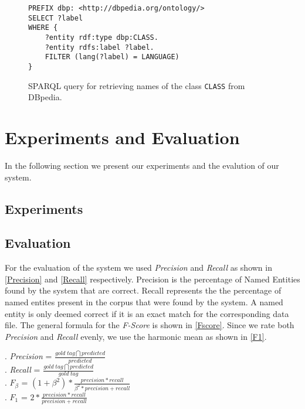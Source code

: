 \documentclass[11pt]{article}
\begin{document}
\begin{figure}
\begin{verbatim}
PREFIX dbp: <http://dbpedia.org/ontology/>
SELECT ?label
WHERE {
    ?entity rdf:type dbp:CLASS.
    ?entity rdfs:label ?label.
    FILTER (lang(?label) = LANGUAGE)
}
\end{verbatim}
\caption{SPARQL query for retrieving names of the class \texttt{CLASS} from DBpedia.}
\end{figure}





\section{Experiments and Evaluation}
In the following section we present our experiments and the evalution of our system.
\subsection*{Experiments}


\subsection*{Evaluation}
For the evaluation of the system we used \emph{Precision} and \emph{Recall} as shown in \ref{Precision} and \ref{Recall} respectively.
Precision is the percentage of Named Entities found by the system that are correct. Recall represents the the percentage of 
named entites present in the corpus that were found by the system. 
A named entity is only deemed correct if it is an exact match for the corresponding data file.
The general formula for the \emph{F-Score} is shown in \ref{Fscore}. Since we rate both \emph{Precision} and \emph{Recall} evenly, we 
use the harmonic mean as shown in \ref{F1}.


\ex. \emph{Precision} = $ \frac{gold\; tag \bigcap predicted}{predicted}$ \label{Precision}\\


\ex. \emph{Recall} = $ \frac{gold \;tag \bigcap predicted}{gold\; tag}$ \label{Recall}\\


\ex. $F_{\beta}$ = $ (1+\beta^2)*\frac{precision *recall}{\beta^2* precision + recall}$ \label{Fscore}\\

\ex. $F_1$ = $ 2*\frac{precision *recall}{precision + recall}$ \label{F1}\\
\end{document}
